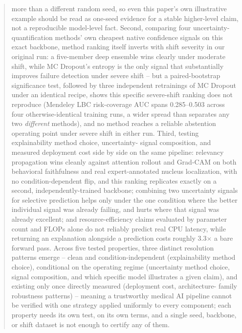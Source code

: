 \documentclass[runningheads]{llncs}
\begin{document}
\begin{abstract}
more than a different random seed, so even this paper's own illustrative
example should be read as one-seed evidence for a stable higher-level
claim, not a reproducible model-level fact. Second, comparing four
uncertainty-quantification methods' own cheapest native confidence
signals on this exact backbone, method ranking itself inverts with shift
severity in our original run: a five-member deep ensemble wins clearly
under moderate shift, while MC Dropout's entropy is the only signal that
substantially improves failure detection under severe shift -- but a
paired-bootstrap significance test, followed by three independent
retrainings of MC Dropout under an identical recipe, shows this specific
severe-shift ranking does not reproduce (Mendeley LBC risk-coverage AUC
spans 0.285--0.503 across four otherwise-identical training runs, a wider
spread than separates any two \emph{different} methods), and no method
reaches a reliable abstention operating point under severe shift in
either run. Third, testing explainability method choice, uncertainty-
signal composition, and measured deployment cost side by side on the same
pipeline: relevancy propagation wins cleanly against attention rollout and
Grad-CAM on both behavioral faithfulness and real expert-annotated nucleus
localization, with no condition-dependent flip, and this ranking
replicates exactly on a second, independently-trained backbone;
combining two uncertainty signals for selective prediction helps only
under the one condition where the better individual signal was already
failing, and hurts where that signal was already excellent; and
resource-efficiency claims evaluated by parameter count and FLOPs alone do
not reliably predict real CPU latency, while returning an explanation
alongside a prediction costs roughly 3.3$\times$ a bare forward pass.
Across five tested properties, three distinct resolution patterns emerge
-- clean and condition-independent (explainability method choice),
conditional on the operating regime (uncertainty method choice, signal
composition, and which specific model illustrates a given claim), and
existing only once directly measured (deployment cost, architecture-
family robustness patterns) -- meaning a trustworthy medical AI pipeline
cannot be verified with one strategy applied uniformly to every
component; each property needs its own test, on its own terms, and a
single seed, backbone, or shift dataset is not enough to certify any of
them.

\end{abstract}
\end{document}
